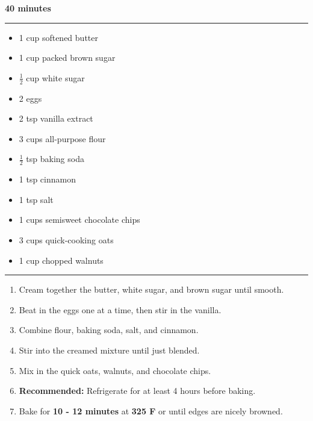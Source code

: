  \hfill {\large \textbf{40 minutes}}

\vspace{15pt} \hrule \vspace{15pt}
\begin{itemize}
	\item 1 cup softened butter
	\item 1 cup packed brown sugar
	\item $\frac{1}{2}$ cup white sugar
	\item 2 eggs
	\item 2 tsp vanilla extract
	\item 3 cups all-purpose flour
	\item $\frac{1}{2}$ tsp baking soda
	\item 1 tsp cinnamon
	\item 1 tsp salt
	\item 1 cups semisweet chocolate chips
	\item 3 cups quick-cooking oats
	\item 1 cup chopped walnuts
\end{itemize}

\vspace{15pt} \hrule \vspace{15pt}
\begin{enumerate}
	\item Cream together the butter, white sugar, and brown sugar until smooth.
	\item Beat in the eggs one at a time, then stir in the vanilla.
	\item Combine flour, baking soda, salt, and cinnamon.
	\item Stir into the creamed mixture until just blended.
	\item Mix in the quick oats, walnuts, and chocolate chips.
	\item \textbf{Recommended:} Refrigerate for at least 4 hours before baking.
	\item Bake for \textbf{10 - 12 minutes} at \textbf{325 F} or until edges are nicely browned.
\end{enumerate}
